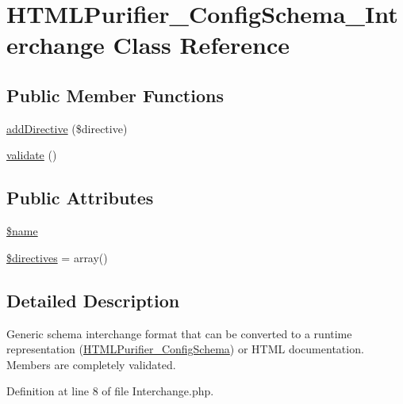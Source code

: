 \hypertarget{classHTMLPurifier__ConfigSchema__Interchange}{\section{H\+T\+M\+L\+Purifier\+\_\+\+Config\+Schema\+\_\+\+Interchange Class Reference}
\label{classHTMLPurifier__ConfigSchema__Interchange}
}
\subsection*{Public Member Functions}
\begin{DoxyCompactItemize}
\item 
\hyperlink{classHTMLPurifier__ConfigSchema__Interchange_a83ce7a87f59eaa36b518ebf38a50312d}{add\+Directive} (\$directive)
\item 
\hyperlink{classHTMLPurifier__ConfigSchema__Interchange_a2cb158f92d9c3d829654294fc335abc4}{validate} ()
\end{DoxyCompactItemize}
\subsection*{Public Attributes}
\begin{DoxyCompactItemize}
\item 
\hyperlink{classHTMLPurifier__ConfigSchema__Interchange_afc0f02aa85fcf661b554115466995f35}{\$name}
\item 
\hyperlink{classHTMLPurifier__ConfigSchema__Interchange_a3843ecbd13ae7227f509ce8336ce18ac}{\$directives} = array()
\end{DoxyCompactItemize}


\subsection{Detailed Description}
Generic schema interchange format that can be converted to a runtime representation (\hyperlink{classHTMLPurifier__ConfigSchema}{H\+T\+M\+L\+Purifier\+\_\+\+Config\+Schema}) or H\+T\+M\+L documentation. Members are completely validated. 

Definition at line 8 of file Interchange.\+php.



